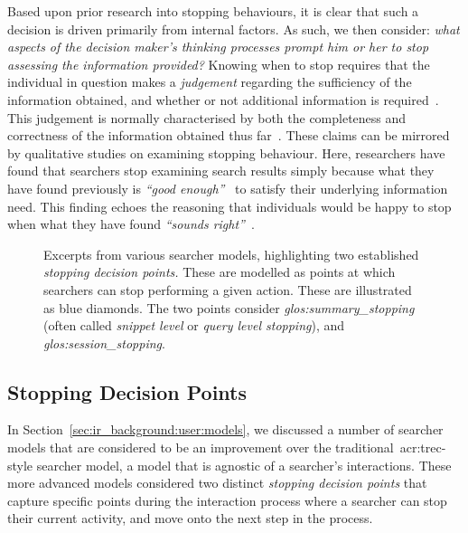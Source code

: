Based upon prior research into stopping behaviours, it is clear that such a decision is driven primarily from internal factors. As such, we then consider: \emph{what aspects of the decision maker's thinking processes prompt him or her to stop assessing the information provided?} Knowing when to stop requires that the individual in question makes a \emph{judgement} regarding the sufficiency of the information obtained, and whether or not additional information is required~\citep{browne2004stopping_rules}. This judgement is normally characterised by both the completeness and correctness of the information obtained thus far~\citep{smith1991belief}. These claims can be mirrored by qualitative studies on examining stopping behaviour. Here, researchers have found that searchers stop examining search results simply because what they have found previously is \emph{``good enough''}~\citep{zach2005enough_is_enough} to satisfy their underlying information need. This finding echoes the reasoning that individuals would be happy to stop when what they have found \emph{``sounds right''}~\citep{perkins1983difficulties}.

\begin{figure}[t!]
    \centering
    \caption[Two established \emph{stopping decision points}]{Excerpts from various searcher models, highlighting two established \emph{stopping decision points.} These are modelled as points at which searchers can stop performing a given action. These are illustrated as blue diamonds. The two points consider  \emph{\gls{glos:summary_stopping}} (often called \emph{snippet level} or \emph{query level stopping}), and  \emph{\gls{glos:session_stopping}}.}
    \label{fig:model_two_points}
\end{figure}

\subsection{Stopping Decision Points}\label{sec:stopping_background:why:points}
In Section~\ref{sec:ir_background:user:models}, we discussed a number of searcher models that are considered to be an improvement over the traditional~\gls{acr:trec}-style searcher model, a model that is agnostic of a searcher's interactions. These more advanced models considered two distinct \emph{stopping decision points} that capture specific points during the interaction process where a searcher can stop their current activity, and move onto the next step in the process.

